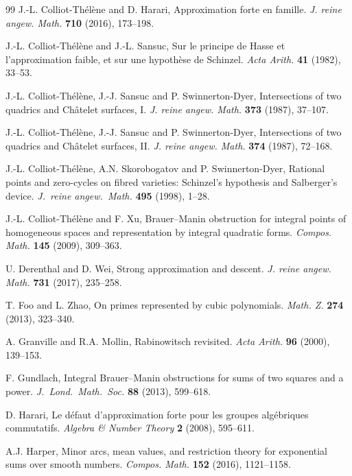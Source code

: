 \documentclass[11pt,letterpaper]{amsart}
\theoremstyle{definition}
\numberwithin{equation}{section}
\newcommand{\0}{\mathbf{0}}
\begin{document}
\begin{thebibliography}{99}
J.-L. Colliot-Th\'el\`ene and D. Harari,
Approximation forte en famille. {\em J. reine angew. Math.} 
{\bf 710} (2016), 173--198.

J.-L. Colliot-Th\'el\`ene and J.-L. Sansuc, 
Sur le principe de Hasse et l'approximation faible, et sur une hypoth\`ese de Schinzel. 
{\em Acta Arith.} {\bf 41} (1982), 33–53. 


J.-L. Colliot-Th\'el\`ene, J.-J. Sansuc and P. Swinnerton-Dyer, 
Intersections of two quadrics and Ch\^atelet surfaces, I.  
{\em J. reine angew. Math.}  {\bf 373}  (1987), 37--107. 


J.-L. Colliot-Th\'el\`ene, J.-J. Sansuc and P. Swinnerton-Dyer, 
Intersections of two quadrics and Ch\^atelet surfaces, II.  
{\em J. reine angew. Math.}  {\bf 374}  (1987), 72--168. 

J.-L. Colliot-Th\'el\`ene, A.N. Skorobogatov and P. Swinnerton-Dyer, Rational
points and zero-cycles on fibred varieties: Schinzel's hypothesis and Salberger's device.
{\em J.\ reine angew.\ Math.} {\bf 495} (1998), 1--28.

J.-L. Colliot-Th\'el\`ene and F. Xu, Brauer--Manin obstruction for integral points of homogeneous spaces
and representation by integral quadratic forms. {\em Compos. Math.} {\bf 145} (2009), 309--363.



U. Derenthal and D. Wei, Strong approximation and descent. {\em J. reine angew. Math.} {\bf 731} (2017), 
235--258.

T. Foo and L. Zhao, On primes represented by cubic polynomials. {\em Math. Z.} {\bf 274} (2013), 323--340.


A. Granville and  R.A. Mollin,
Rabinowitsch revisited.
{\em Acta Arith.} {\bf 96} (2000), 139--153.

F. Gundlach, Integral Brauer--Manin obstructions for sums of two squares and a power. {\em J.\ Lond.\ Math.\ Soc.}  {\bf 88} (2013), 599--618. 

D. Harari, 
Le d\'efaut d'approximation forte pour les groupes alg\'ebriques commutatifs. 
{\em Algebra \& Number Theory} {\bf 2} (2008), 595--611.

A.J. Harper,
Minor arcs, mean values, and restriction theory for exponential sums over smooth numbers. 
{\em Compos. Math.} {\bf 152} (2016), 1121--1158.


\end{thebibliography}
\end{document}
